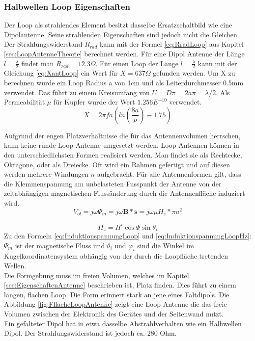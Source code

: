\subsubsection{Halbwellen Loop Eigenschaften}
Der Loop als strahlendes Element besitzt dasselbe Ersatzschaltbild wie eine Dipolantenne. Seine strahlenden Eigenschaften sind jedoch nicht die Gleichen. Der Strahlungswiderstand $R_{rad}$ kann mit der Formel \ref{eq:RradLoop} aus Kapitel \ref{sec:LoopAntenneTheorie} berechnet werden. Für eine Dipol Antenne der Länge $l=\frac{\lambda}{2}$ findet man $R_{rad} = 12.3\Omega$. Für einen Loop der Länge $l=\frac{\lambda}{2}$ kann mit der Gleichung \ref{eq:XantLoop} ein Wert für $X = 637 \Omega$ gefunden werden. Um X zu berechnen wurde ein Loop Radius a von 1cm und als Leiterdurchmesser 0.5mm verwendet. Das führt zu einem Kreisumfang von $U=D\pi=2a\pi=\lambda /2$. Als Permeabilität $\mu $ für Kupfer wurde der Wert $1.256E^{-10}$ verwendet.
\begin{equation}\label{eq:XantLoop}
X= 2\pi f a(ln \left( \frac{8a}{p} \right) - 1.75)
\end{equation}

Aufgrund der engen Platzverhältnisse die für das Antennenvolumen herrschen, kann keine runde Loop Antenne umgesetzt werden. Loop Antennen können in den unterschiedlichsten Formen realisiert werden. Man findet sie als Rechtecke, Oktagone, oder als Dreiecke. Oft wird ein Rahmen gefertigt und auf diesen  werden mehrere Windungen $n$ aufgebracht. Für alle Antennenformen gilt, dass die Klemmenspannung am unbelasteten Fusspunkt der Antenne von der zeitabhängigen magnetischen Flussänderung durch die Antennenfläche induziert wird.
\begin{equation}\label{eq:InduktionspannungLoop}
V_{ol}= j\omega\Psi_{m}=j\omega\textbf{B}*\textbf{s}= j\omega\mu H_{z}*\pi a^{2}
\end{equation}

\begin{equation}\label{eq:InduktionspannungLoopHz}
H_{z}=H^{i}\cos\Psi\sin\theta_{i}
\end{equation}
Zu den Formeln \ref{eq:InduktionspannungLoop} und \ref{eq:InduktionspannungLoopHz}: \\
$\Psi_{m}$ ist der magnetische Fluss und $\theta_{i}$ und $\varphi_{i}$  sind die Winkel im Kugelkoordinatensystem abhängig von der durch die Loopfläche tretenden Wellen.\\ 
Die Formgebung muss im freien Volumen, welches im Kapitel \ref{sec:EigenschaftenAntenne} beschrieben ist, Platz finden. Dies führt zu einem langen, flachen Loop. Die Form erinnert stark an jene eines Faltdipols. Die Abbildung \ref{fig:FflacheLoopAntenne} zeigt eine Loop Antenne die das freie Volumen zwischen der Elektronik des Gerätes und der Seitenwand nutzt.\\
Ein gefalteter Dipol hat in etwa dasselbe Abstrahlverhalten wie ein Halbwellen Dipol. Der Strahlungswiderstand ist jedoch  ca.  280 Ohm. 

